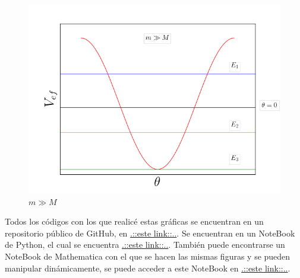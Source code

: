 \documentclass[a4paper,10pt]{article}
\numberwithin{equation}{section}
\begin{document}
\begin{figure}[H]
 \center
 \includegraphics[scale=0.45]{problema3fig4}
 \caption{$m \gg M$}
 \label{fig:problema3fig4}
\end{figure}

Todos los códigos con los que realicé estas gráficas se encuentran en un repositorio 
público de GitHub, en \href{https://github.com/FavioVazquez/MecanicaClasica-PCF/tree/master/Tarea5}{\color{blue}.::este link::..}. Se encuentran en un 
NoteBook de Python, el cual se encuentra \href{https://github.com/FavioVazquez/MecanicaClasica-PCF/blob/master/Tarea5/Problema1.ipynb}{\color{blue}.::este link::..}.
También puede encontrarse un NoteBook de Mathematica con el que se hacen 
las mismas figuras y se pueden manipular dinámicamente, se puede acceder 
a este NoteBook en \href{https://github.com/FavioVazquez/MecanicaClasica-PCF/blob/master/Tarea5/effpotential.nb}{\color{blue}.::este link::..}.
\end{document}
